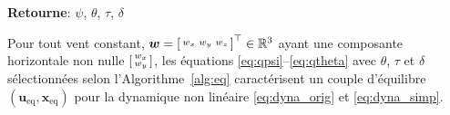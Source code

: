 \begin{algorithm}
\begin{algorithmic}[1]
    \end{algorithmic}
    \hspace*{.1cm} \textbf{Retourne}:  $\psi$, $\theta$, $\tau$, $\delta$
    \end{algorithm}

    \noindent\begin{minipage}{\linewidth}
        \begin{theorem}\label{thm:eqs}
        Pour tout vent constant, $\boldsymbol{w} =\left[ \begin{smallmatrix}w_x & w_y & w_z \end{smallmatrix} \right]^\top \in {\mathbb R}^3$ ayant une composante horizontale non nulle $\left[ \begin{smallmatrix}w_x \\ w_y \end{smallmatrix} \right]$, les équations \eqref{eq:qpsi}--\eqref{eq:qtheta} avec $\theta$, $\tau$ et $\delta$ sélectionnées selon l'Algorithme~\ref{alg:eq} caractérisent un couple d'équilibre $(\boldsymbol{u}_{\text{eq}}, \boldsymbol{x}_{\text{eq}})$ pour la dynamique non linéaire \eqref{eq:dyna_orig} et \eqref{eq:dyna_simp}.
        \end{theorem}
    \end{minipage}
    

